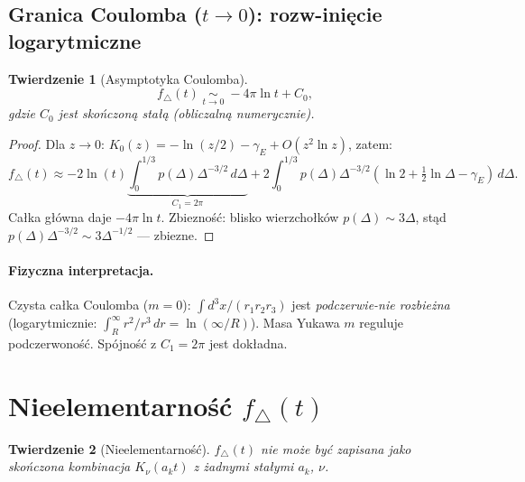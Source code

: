 \documentclass[11pt,a4paper]{article}
\newcommand{\Dt}{\Delta}
\newtheorem{theorem}{Twierdzenie}
\begin{document}
\subsection{Granica Coulomba ($t\to 0$): rozw-ini\k{e}cie logarytmiczne}

\begin{theorem}[Asymptotyka Coulomba]
\label{thm:small_t}
\begin{equation}
\label{eq:f_small_t}
\boxed{
f_\triangle(t) \;\underset{t\to 0}{\sim}\;
-4\pi\ln t + C_0,
}
\end{equation}
gdzie $C_0$ jest sko\'nczon\k{a} sta\l{}\k{a} (obliczaln\k{a} numerycznie).
\end{theorem}

\begin{proof}
Dla $z\to0$: $K_0(z)=-\ln(z/2)-\gamma_E+O(z^2\ln z)$, zatem:
\[
f_\triangle(t) \approx -2\ln(t)\underbrace{\int_0^{1/3}p(\Dt)\Dt^{-3/2}\,d\Dt}_{C_1=2\pi}
+ 2\int_0^{1/3}p(\Dt)\Dt^{-3/2}(\ln2+\tfrac12\ln\Dt-\gamma_E)\,d\Dt.
\]
Ca\l{}ka g\l{}\'owna daje $-4\pi\ln t$.
Zbiezno\'s\'c: blisko wierzcho\l{}k\'ow $p(\Dt)\sim3\Dt$, st\k{a}d
$p(\Dt)\Dt^{-3/2}\sim3\Dt^{-1/2}$ --- zbiezne.
\end{proof}

\paragraph{Fizyczna interpretacja.}
Czysta ca\l{}ka Coulomba ($m=0$): $\int d^3x/(r_1 r_2 r_3)$ jest
\emph{podczerwie-nie rozbie\.{z}na} (logarytmicznie: $\int_R^\infty r^2/r^3\,dr=\ln(\infty/R)$).
Masa Yukawa $m$ reguluje podczerwono\'s\'c. Sp\'ojno\'s\'c z $C_1=2\pi$ jest
dok\l{}adna.



\section{Nieelementarno\'s\'c $f_\triangle(t)$}
\label{sec:nonelementary}

\begin{theorem}[Nieelementarno\'s\'c]
\label{thm:nonelementary}
$f_\triangle(t)$ nie mo\.{z}e by\'c zapisana jako sko\'nczona kombinacja
$K_\nu(a_k t)$ z \.{z}adnymi sta\l{}ymi $a_k$, $\nu$.
\end{theorem}
\end{document}
